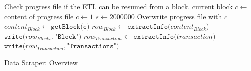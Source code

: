 \begin{algorithm}
\begin{algorithmic}
\State Check progress file if the ETL can be resumed from a block.
    \State current block $c \gets$ content of progress file
\Else
    \State $c \gets 1$
\EndIf
\State $s \gets 2000000$ 
   \State Overwrite progress file with $c$ 
   \State $content_{Block} \gets \texttt{getBlock(c)}$
   \State $row_{Block} \gets \texttt{extractInfo(}content_{Block}\texttt{)}$
   \State $\texttt{write(} row_{Blocks}, \texttt{"Block")}$
       \State $row_{Transaction} \gets \texttt{extractInfo(}transaction\texttt{)}$
       \State $\texttt{write(} row_{Transaction}, \texttt{"Transactions")}$
   \EndFor
\EndWhile
\end{algorithmic}
\caption{Data Scraper: Overview}
\label{etl}
\end{algorithm}


